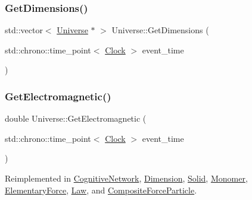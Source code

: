 \mbox{\label{classUniverse_a1869fc7bf43827378bab5a701f7f917a}} 
\subsubsection{\texorpdfstring{Get\+Dimensions()}{GetDimensions()}}
{\footnotesize\ttfamily std\+::vector$<$ \mbox{\hyperlink{classUniverse}{Universe}} $\ast$ $>$ Universe\+::\+Get\+Dimensions (\begin{DoxyParamCaption}\item[{std\+::chrono\+::time\+\_\+point$<$ \mbox{\hyperlink{universe_8h_a0ef8d951d1ca5ab3cfaf7ab4c7a6fd80}{Clock}} $>$}]{event\+\_\+time }\end{DoxyParamCaption})}

\mbox{\label{classUniverse_a63b850ef3f3394313353109d222bf5d1}} 
\subsubsection{\texorpdfstring{Get\+Electromagnetic()}{GetElectromagnetic()}}
{\footnotesize\ttfamily double Universe\+::\+Get\+Electromagnetic (\begin{DoxyParamCaption}\item[{std\+::chrono\+::time\+\_\+point$<$ \mbox{\hyperlink{universe_8h_a0ef8d951d1ca5ab3cfaf7ab4c7a6fd80}{Clock}} $>$}]{event\+\_\+time }\end{DoxyParamCaption})\hspace{0.3cm}{\ttfamily [virtual]}}



Reimplemented in \mbox{\hyperlink{classCognitiveNetwork_a09e5a1c774c84529a7adfe56fadb7467}{Cognitive\+Network}}, \mbox{\hyperlink{classDimension_a21783c29a576518b722512f1245fa598}{Dimension}}, \mbox{\hyperlink{classSolid_a01cd3c441a4e339927c43536de6d9b5e}{Solid}}, \mbox{\hyperlink{classMonomer_ad23f4829d66cb20401cc72a9d72ac320}{Monomer}}, \mbox{\hyperlink{classElementaryForce_a2c8bc3226f42710717775c73eee1644e}{Elementary\+Force}}, \mbox{\hyperlink{classLaw_a01eba6e68d2d8a717e2b4789be90853d}{Law}}, and \mbox{\hyperlink{classCompositeForceParticle_a8ef336fed7e33d52a3baae4bd4dd32fd}{Composite\+Force\+Particle}}.

